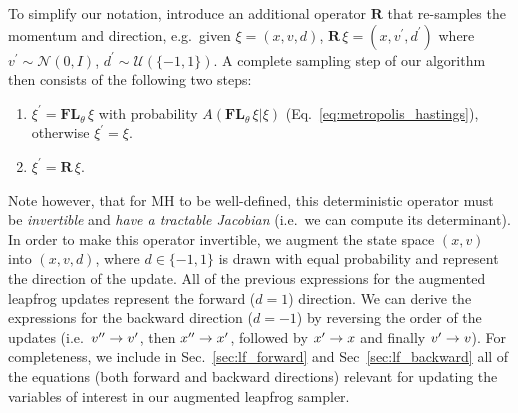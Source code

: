 \documentclass[main.tex]{subfiles}
\begin{document}
%
To simplify our notation, introduce an additional operator $\mathbf{R}$ that re-samples the momentum and direction,
e.g.\ given $\xi = (x, v, d)$, $\mathbf{R}\,\xi = (x, v^{\prime}, d^{\prime})$ where $v^{\prime} \sim \mathcal{N}(0,
I)$, $d^{\prime} \sim \mathcal{U}\left(\{-1, 1\}\right)$.
%
A complete sampling step of our algorithm then consists of the following two steps:
%
\begin{enumerate}
    \item $\xi^{\prime} = \mathbf{FL}_{\theta} \,\xi$ with probability
        $A(\mathbf{FL}_{\theta}\,\xi|\xi)$ (Eq.~\ref{eq:metropolis_hastings}),
        otherwise $\xi^{\prime} = \xi$.
    \item $\xi^{\prime} = \mathbf{R}\,\xi$.
\end{enumerate}
%
Note however, that for MH to be well-defined, this deterministic operator must be \emph{invertible} and \emph{have a
tractable Jacobian} (i.e.\ we can compute its determinant).
%
In order to make this operator invertible, we augment the state space $(x, v)$ into $(x, v, d)$, where $d \in \{-1,
1\}$ is drawn with equal probability and represent the direction of the update.
%
All of the previous expressions for the augmented leapfrog updates represent the forward ($d = 1$) direction.
%
We can derive the expressions for the backward direction ($d = -1$) by reversing the order of the updates (i.e.\ ${v^{\prime\prime}}
\rightarrow {v^{\prime}}$, then ${x^{\prime\prime}} \rightarrow {x^{\prime}}$, followed by ${x^{\prime}} \rightarrow x$ and finally ${v^{\prime}} \rightarrow v$).
%
For completeness, we include in Sec.~\ref{sec:lf_forward} and
Sec~\ref{sec:lf_backward} all of the equations (both forward and backward directions)
relevant for updating the variables of interest in our augmented leapfrog sampler.
\end{document}
